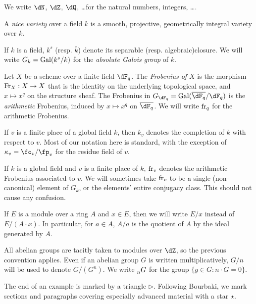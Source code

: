 \documentclass{article}
\begin{document}
We write $\dN$, $\dZ$, $\dQ$, \ldots for the natural numbers, integers, \ldots. 

A \emph{nice variety} over a field $k$ is a smooth, projective, geometrically 
integral variety over $k$. 

If $k$ is a field, $k^s$ (resp. $\bar k$) denote its separable (resp. 
algebraic)closure. We will write $G_k = \operatorname{Gal}(k^s/k)$ for the \emph{absolute 
Galois group} of $k$. 


Let $X$ be a scheme over a finite field $\dF_q$. The \emph{Frobenius of $X$} 
is the morphism $\mathrm{Fr}_X:X\to X$ that is the identity on the underlying 
topological space, and $x\mapsto x^q$ on the structure sheaf. The Frobenius in 
$G_{\dF_q} = \gal(\overline{\dF_q}/\dF_q)$ is the \emph{arithmetic} Frobenius, 
induced by $x\mapsto x^q$ on $\overline{\dF_q}$. We will write $\mathrm{fr}_q$ for 
the arithmetic Frobenius. 

If $v$ is a finite place of a global field $k$, then $k_v$ denotes the 
completion of $k$ with respect to $v$. Most of our notation here is standard, 
with the exception of $\kappa_v=\fo_v/\fp_v$ for the residue field of $v$. 

If $k$ is a global field and $v$ is a finite place of $k$, $\mathrm{fr}_v$ denotes the 
arithmetic Frobenius associated to $v$. We will sometimes take $\mathrm{fr}_v$ to be 
a single (non-canonical) element of $G_k$, or the elements' entire conjugacy 
class. This should not cause any confusion. 

If $E$ is a module over a ring $A$ and $x\in E$, then we will write $E/x$ 
instead of $E/(A\cdot x)$. In particular, for $a\in A$, $A/a$ is the quotient 
of $A$ by the ideal generated by $A$. 

All abelian groups are tacitly taken to modules over $\dZ$, so the previous 
convention applies. Even if an abelian group $G$ is written multiplicatively, 
$G/n$ will be used to denote $G/(G^n)$. We write $\prescript{}{n}{G}$ for the 
group $\{g\in G:n\cdot G=0\}$. 

The end of an example is marked by a triangle $\triangleright$. Following 
Bourbaki, we mark sections and paragraphs covering especially advanced 
material with a star $\star$. 
\end{document}
